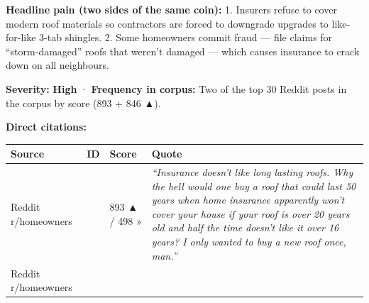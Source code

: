 \documentclass[
  10pt,
]{article}
\let\origtexttt\texttt
\renewcommand{\texttt}[1]{\origtexttt{\seqsplit{#1}}}
\begin{document}
\textbf{Headline pain (two sides of the same coin):} 1. Insurers refuse to cover modern roof
materials so contractors are forced to downgrade upgrades to like-for-like 3-tab shingles. 2. Some
homeowners commit fraud --- file claims for ``storm-damaged'' roofs that weren't damaged --- which
causes insurance to crack down on all neighbours.

\textbf{Severity:} \textbf{High} · \textbf{Frequency in corpus:} Two of the top 30 Reddit posts in
the corpus by score (893 + 846 ▲).

\textbf{Direct citations:}

\begin{longtable}[]{@{}llll@{}}
\toprule
\begin{minipage}[b]{0.20\columnwidth}\raggedright
Source\strut
\end{minipage} & \begin{minipage}[b]{0.14\columnwidth}\raggedright
ID\strut
\end{minipage} & \begin{minipage}[b]{0.10\columnwidth}\raggedright
Score\strut
\end{minipage} & \begin{minipage}[b]{0.44\columnwidth}\raggedright
Quote\strut
\end{minipage}\tabularnewline
\midrule
\endhead
\begin{minipage}[t]{0.20\columnwidth}\raggedright
Reddit r/homeowners\strut
\end{minipage} & \begin{minipage}[t]{0.14\columnwidth}\raggedright
\texttt{1s8mpb1}\strut
\end{minipage} & \begin{minipage}[t]{0.10\columnwidth}\raggedright
893 ▲ / 498 »\strut
\end{minipage} & \begin{minipage}[t]{0.44\columnwidth}\raggedright
\emph{``Insurance doesn't like long lasting roofs. Why the hell would one buy a roof that could last
50 years when home insurance apparently won't cover your house if your roof is over 20 years old and
half the time doesn't like it over 16 years? I only wanted to buy a new roof once, man.''}\strut
\end{minipage}\tabularnewline
\begin{minipage}[t]{0.20\columnwidth}\raggedright
Reddit r/homeowners\strut
\end{minipage} & \begin{minipage}[t]{0.14\columnwidth}\raggedright

\end{minipage}
\end{longtable}
\end{document}
